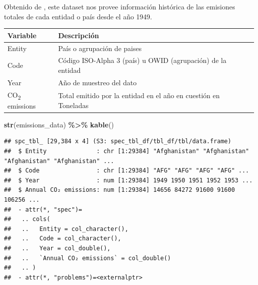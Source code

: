 \documentclass[
]{book}
\newenvironment{Shaded}{\begin{snugshade}}{\end{snugshade}}
\newcommand{\FunctionTok}[1]{\textcolor[rgb]{0.13,0.29,0.53}{\textbf{#1}}}
\newcommand{\NormalTok}[1]{#1}
\newcommand{\SpecialCharTok}[1]{\textcolor[rgb]{0.81,0.36,0.00}{\textbf{#1}}}
\begin{document}
Obtenido de \citep{ref1}, este dataset nos provee información histórica de las emisiones totales de cada entidad o país desde el año 1949.

\begin{longtable}[]{@{}
  >{\raggedright\arraybackslash}p{}
  >{\raggedright\arraybackslash}p{}@{}}
\toprule\noalign{}
\begin{minipage}[b]{\linewidth}\raggedright
Variable
\end{minipage} & \begin{minipage}[b]{\linewidth}\raggedright
Descripción
\end{minipage} \\
\midrule\noalign{}
\endhead
\bottomrule\noalign{}
\endlastfoot
Entity & País o agrupación de paises \\
Code & Código ISO-Alpha 3 (país) u OWID (agrupación) de la entidad \\
Year & Año de muestreo del dato \\
CO\textsubscript{2} emissions & Total emitido por la entidad en el año en cuestión en Toneladas \\
\end{longtable}

\begin{Shaded}
\begin{Highlighting}[]
\FunctionTok{str}\NormalTok{(emissions\_data) }\SpecialCharTok{\%\textgreater{}\%} \FunctionTok{kable}\NormalTok{()}
\end{Highlighting}
\end{Shaded}

\begin{verbatim}
## spc_tbl_ [29,384 x 4] (S3: spec_tbl_df/tbl_df/tbl/data.frame)
##  $ Entity              : chr [1:29384] "Afghanistan" "Afghanistan" "Afghanistan" "Afghanistan" ...
##  $ Code                : chr [1:29384] "AFG" "AFG" "AFG" "AFG" ...
##  $ Year                : num [1:29384] 1949 1950 1951 1952 1953 ...
##  $ Annual CO₂ emissions: num [1:29384] 14656 84272 91600 91600 106256 ...
##  - attr(*, "spec")=
##   .. cols(
##   ..   Entity = col_character(),
##   ..   Code = col_character(),
##   ..   Year = col_double(),
##   ..   `Annual CO₂ emissions` = col_double()
##   .. )
##  - attr(*, "problems")=<externalptr>
\end{verbatim}

\begin{tabular}{}
\hline

\hline
\end{tabular}
\end{document}
